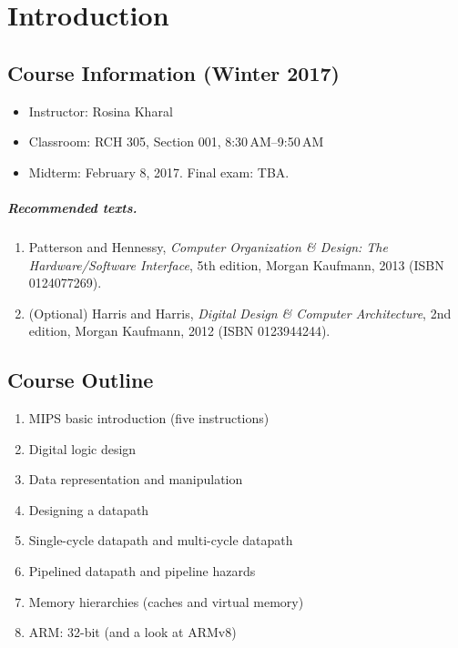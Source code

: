 \chapter{Introduction}

\section{Course Information (Winter 2017)}

\begin{itemize}
  \item Instructor: Rosina Kharal
  \item Classroom: RCH 305, Section 001, 8:30\,AM--9:50\,AM
  \item Midterm: February 8, 2017. Final exam: TBA.
\end{itemize}

\paragraph{Recommended texts.}
\begin{enumerate}
  \item Patterson and Hennessy, \emph{Computer Organization \& Design: The
    Hardware/Software Interface}, 5th edition, Morgan Kaufmann, 2013
    (ISBN 0124077269).
  \item (Optional) Harris and Harris, \emph{Digital Design \& Computer
    Architecture}, 2nd edition, Morgan Kaufmann, 2012 (ISBN 0123944244).
\end{enumerate}

\section{Course Outline}

\begin{enumerate}
  \item MIPS basic introduction (five instructions)
  \item Digital logic design
  \item Data representation and manipulation
  \item Designing a datapath
  \item Single-cycle datapath and multi-cycle datapath
  \item Pipelined datapath and pipeline hazards
  \item Memory hierarchies (caches and virtual memory)
  \item ARM: 32-bit (and a look at ARMv8)
\end{enumerate}

